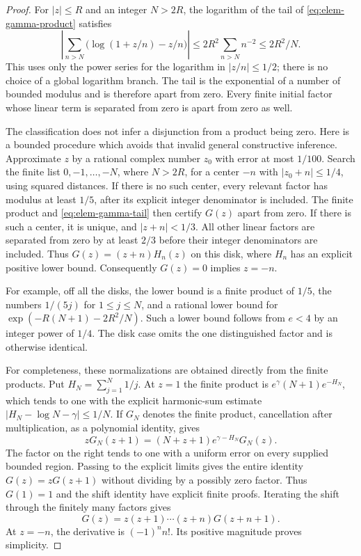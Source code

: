 \begin{proof}
For $|z|\le R$ and an integer $N>2R$, the logarithm of the tail of
\eqref{eq:elem-gamma-product} satisfies
\begin{equation}
 \left|\sum_{n>N}\bigl(\log(1+z/n)-z/n\bigr)\right|
 \le2R^2\sum_{n>N}n^{-2}\le2R^2/N.
 \label{eq:elem-gamma-tail}
\end{equation}
This uses only the power series for the logarithm in $|z/n|\le1/2$;
there is no choice of a global logarithm branch.  The tail is the
exponential of a number of bounded modulus and is therefore apart from
zero.  Every finite initial factor whose linear term is separated from
zero is apart from zero as well.

The classification does not infer a disjunction from a product being
zero.  Here is a bounded procedure which avoids that invalid general
constructive inference.  Approximate $z$ by a rational complex number
$z_0$ with error at most $1/100$.  Search the finite list
$0,-1,\ldots,-N$, where $N>2R$, for a center $-n$ with
$|z_0+n|\le1/4$, using squared distances.  If there is no such center,
every relevant factor has modulus at least $1/5$, after its explicit
integer denominator is included.  The finite product and
\eqref{eq:elem-gamma-tail} then certify $G(z)$ apart from zero.  If
there is such a center, it is unique, and $|z+n|<1/3$.  All other
linear factors are separated from zero by at least $2/3$ before their
integer denominators are included.  Thus
$G(z)=(z+n)H_n(z)$ on this disk, where $H_n$ has an explicit positive
lower bound.  Consequently $G(z)=0$ implies $z=-n$.

For example, off all the disks, the lower bound is a finite product of
$1/5$, the numbers $1/(5j)$ for $1\le j\le N$, and a rational lower
bound for $\exp(-R(N+1)-2R^2/N)$.  Such a lower bound follows from
$e<4$ by an integer power of $1/4$.  The disk case omits the one
distinguished factor and is otherwise identical.

For completeness, these normalizations are obtained directly from the
finite products.  Put $H_N=\sum_{j=1}^N1/j$.  At $z=1$ the finite
product is $e^\gamma(N+1)e^{-H_N}$, which tends to one with the
explicit harmonic-sum estimate
$|H_N-\log N-\gamma|\le1/N$.  If $G_N$ denotes the finite product,
cancellation after multiplication, as a polynomial identity, gives
\[
 zG_N(z+1)=(N+z+1)e^{\gamma-H_N}G_N(z).
\]
The factor on the right tends to one with a uniform error on every
supplied bounded region.  Passing to the explicit limits gives the
entire identity $G(z)=zG(z+1)$ without dividing by a possibly zero
factor.
Thus $G(1)=1$ and the shift identity have explicit finite proofs.
Iterating the shift through the finitely many factors gives
\[
 G(z)=z(z+1)\cdots(z+n)G(z+n+1).
\]
At $z=-n$, the derivative is $(-1)^n n!$.  Its positive magnitude
proves simplicity.
\end{proof}

